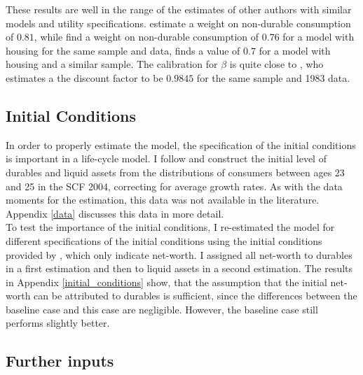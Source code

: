 \documentclass[a4paper,12pt,legno]{article}
\begin{document}
These results are well in the range of the estimates of other authors with similar models and utility specifications. \cite{FV&K2011} estimate a weight on non-durable consumption of $0.81$, while \cite{hintermaier2016} find a weight on non-durable consumption of $0.76$ for a model with housing for the same sample and data, \cite{gruber2003precautionary} finds a value of $0.7$ for a model with housing and a similar sample.
The calibration for $\beta$ is quite close to \cite{hintermaier2011}, who estimates a the discount factor to be $0.9845$ for the same sample and 1983 data. 

\subsection{Initial Conditions}
In order to properly estimate the model, the specification of the initial conditions is important in a life-cycle model. I follow \cite{hintermaier2011} and construct the initial level of durables and liquid assets from the distributions of consumers between ages 23 and 25 in the SCF 2004, correcting for average growth rates. As with the data moments for the estimation, this data was not available in the literature. Appendix \ref{data} discusses this data in more detail. \\
To test the importance of the initial conditions, I re-estimated the model for different specifications of the initial conditions using the initial conditions provided by \cite{hintermaier2011}, which only indicate net-worth. I assigned all net-worth to durables in a first estimation and then to liquid assets in a second estimation. The results in Appendix \ref{initial_conditions} show, that the assumption that the initial net-worth can be attributed to durables is sufficient, since the differences between the baseline case and this case are negligible. However, the baseline case still performs slightly better. 

\subsection{Further inputs}
\end{document}
